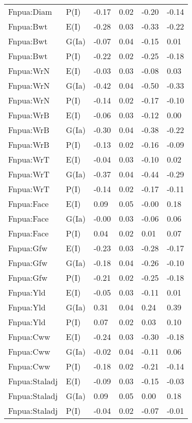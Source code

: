 \begin{center}
\begin{longtable}{|p{1.1in}|p{0.7in}|p{0.7in}|p{0.6in}|p{0.6in}|p{0.6in}|}
  Fnpua:Diam & P(I) & -0.17 & 0.02 & -0.20 & -0.14 \\ 
  Fnpua:Bwt & E(I) & -0.28 & 0.03 & -0.33 & -0.22 \\ 
  Fnpua:Bwt & G(Ia) & -0.07 & 0.04 & -0.15 & 0.01 \\ 
  Fnpua:Bwt & P(I) & -0.22 & 0.02 & -0.25 & -0.18 \\ 
  Fnpua:WrN & E(I) & -0.03 & 0.03 & -0.08 & 0.03 \\ 
  Fnpua:WrN & G(Ia) & -0.42 & 0.04 & -0.50 & -0.33 \\ 
  Fnpua:WrN & P(I) & -0.14 & 0.02 & -0.17 & -0.10 \\ 
  Fnpua:WrB & E(I) & -0.06 & 0.03 & -0.12 & 0.00 \\ 
  Fnpua:WrB & G(Ia) & -0.30 & 0.04 & -0.38 & -0.22 \\ 
  Fnpua:WrB & P(I) & -0.13 & 0.02 & -0.16 & -0.09 \\ 
  Fnpua:WrT & E(I) & -0.04 & 0.03 & -0.10 & 0.02 \\ 
  Fnpua:WrT & G(Ia) & -0.37 & 0.04 & -0.44 & -0.29 \\ 
  Fnpua:WrT & P(I) & -0.14 & 0.02 & -0.17 & -0.11 \\ 
  Fnpua:Face & E(I) & 0.09 & 0.05 & -0.00 & 0.18 \\ 
  Fnpua:Face & G(Ia) & -0.00 & 0.03 & -0.06 & 0.06 \\ 
  Fnpua:Face & P(I) & 0.04 & 0.02 & 0.01 & 0.07 \\ 
  Fnpua:Gfw & E(I) & -0.23 & 0.03 & -0.28 & -0.17 \\ 
  Fnpua:Gfw & G(Ia) & -0.18 & 0.04 & -0.26 & -0.10 \\ 
  Fnpua:Gfw & P(I) & -0.21 & 0.02 & -0.25 & -0.18 \\ 
  Fnpua:Yld & E(I) & -0.05 & 0.03 & -0.11 & 0.01 \\ 
  Fnpua:Yld & G(Ia) & 0.31 & 0.04 & 0.24 & 0.39 \\ 
  Fnpua:Yld & P(I) & 0.07 & 0.02 & 0.03 & 0.10 \\ 
  Fnpua:Cww & E(I) & -0.24 & 0.03 & -0.30 & -0.18 \\ 
  Fnpua:Cww & G(Ia) & -0.02 & 0.04 & -0.11 & 0.06 \\ 
  Fnpua:Cww & P(I) & -0.18 & 0.02 & -0.21 & -0.14 \\ 
  Fnpua:Staladj & E(I) & -0.09 & 0.03 & -0.15 & -0.03 \\ 
  Fnpua:Staladj & G(Ia) & 0.09 & 0.05 & 0.00 & 0.18 \\ 
  Fnpua:Staladj & P(I) & -0.04 & 0.02 & -0.07 & -0.01 \\ 

\end{longtable}
\end{center}
